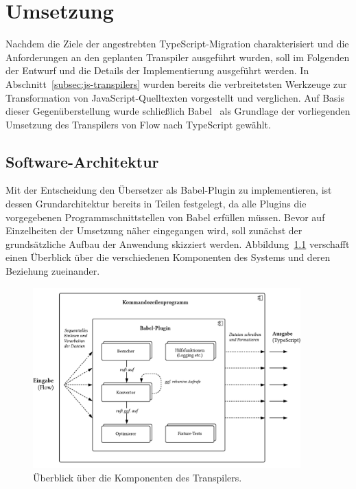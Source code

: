 \chapter{Umsetzung}
\label{chap:implementation}

Nachdem die Ziele der angestrebten TypeScript-Migration charakterisiert und die Anforderungen an den geplanten Transpiler ausgeführt wurden, soll im Folgenden der Entwurf und die Details der Implementierung ausgeführt werden. In Abschnitt~\ref{subsec:js-transpilers} wurden bereits die verbreitetsten Werkzeuge zur Transformation von JavaScript-Quelltexten vorgestellt und verglichen. Auf Basis dieser Gegenüberstellung wurde schließlich Babel~\autocite{BABEL} als Grundlage der vorliegenden Umsetzung des Transpilers von Flow nach TypeScript gewählt.

\section{Software-Architektur}
\label{sec:software-architecture}

Mit der Entscheidung den Übersetzer als Babel-Plugin zu implementieren, ist dessen Grundarchitektur bereits in Teilen festgelegt, da alle Plugins die vorgegebenen Programmschnittstellen von Babel erfüllen müssen. Bevor auf Einzelheiten der Umsetzung näher eingegangen wird, soll zunächst der grundsätzliche Aufbau der Anwendung skizziert werden. Abbildung~\ref{fig:architecture-overview} verschafft einen Überblick über die verschiedenen Komponenten des Systems und deren Beziehung zueinander.

\begin{figure}[tbp]
  \centering
  \includegraphics[width=0.92\textwidth]{src/4_Umsetzung/fig/architecture-overview.pdf}
	\caption{Überblick über die Komponenten des Transpilers.}
	\label{fig:architecture-overview}
\end{figure}

